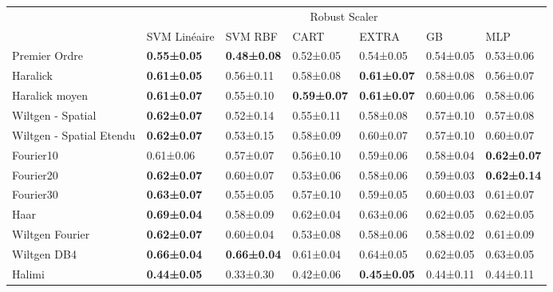 \begin{table}[]
\begin{tabular}{lllllll}
                         & \multicolumn{6}{c}{Robust Scaler}                                                                                  \\
                         & SVM Linéaire       & SVM RBF            & CART               & EXTRA              & GB        & MLP                \\
Premier Ordre            & \textbf{0.55±0.05} & \textbf{0.48±0.08} & 0.52±0.05          & 0.54±0.05          & 0.54±0.05 & 0.53±0.06          \\
Haralick                 & \textbf{0.61±0.05} & 0.56±0.11          & 0.58±0.08          & \textbf{0.61±0.07} & 0.58±0.08 & 0.56±0.07          \\
Haralick moyen           & \textbf{0.61±0.07} & 0.55±0.10          & \textbf{0.59±0.07} & \textbf{0.61±0.07} & 0.60±0.06 & 0.58±0.06          \\
Wiltgen - Spatial        & \textbf{0.62±0.07} & 0.52±0.14          & 0.55±0.11          & 0.58±0.08          & 0.57±0.10 & 0.57±0.08          \\
Wiltgen - Spatial Etendu & \textbf{0.62±0.07} & 0.53±0.15          & 0.58±0.09          & 0.60±0.07          & 0.57±0.10 & 0.60±0.07          \\
Fourier10                & 0.61±0.06          & 0.57±0.07          & 0.56±0.10          & 0.59±0.06          & 0.58±0.04 & \textbf{0.62±0.07} \\
Fourier20                & \textbf{0.62±0.07} & 0.60±0.07          & 0.53±0.06          & 0.58±0.06          & 0.59±0.03 & \textbf{0.62±0.14} \\
Fourier30                & \textbf{0.63±0.07} & 0.55±0.05          & 0.57±0.10          & 0.59±0.05          & 0.60±0.03 & 0.61±0.07          \\
Haar                     & \textbf{0.69±0.04} & 0.58±0.09          & 0.62±0.04          & 0.63±0.06          & 0.62±0.05 & 0.62±0.05          \\
Wiltgen Fourier          & \textbf{0.62±0.07} & 0.60±0.04          & 0.53±0.08          & 0.58±0.06          & 0.58±0.02 & 0.61±0.09          \\
Wiltgen DB4              & \textbf{0.66±0.04} & \textbf{0.66±0.04} & 0.61±0.04          & 0.64±0.05          & 0.62±0.05 & 0.63±0.05          \\
Halimi                   & \textbf{0.44±0.05} & 0.33±0.30          & 0.42±0.06          & \textbf{0.45±0.05} & 0.44±0.11 & 0.44±0.11         
\end{tabular}
\end{table}

